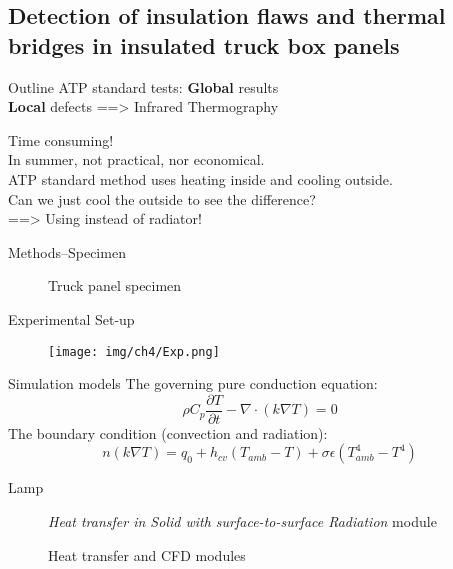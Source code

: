 \subsection{Detection of insulation flaws and thermal bridges in insulated truck box panels}

\begin{frame}{Outline}
    ATP standard tests: \textbf{Global} results\\
    \textbf{Local} defects ==> \alert{Infrared Thermography}

    Time consuming!\\
    In summer, not practical, nor economical.
    \\
    ATP standard method uses heating inside and cooling outside.\\
    Can we just cool the outside to see the difference?\\
    \pause
    ==> Using {\color{cyan}{compressed air}} instead of \alert{radiator!}
\end{frame}


\begin{frame}{Methods--Specimen}
    \begin{figure}[ht]
    \hspace*{-20pt}
    \pause
    \caption{Truck panel specimen}
    \end{figure}
 
\end{frame}


\begin{frame}{Experimental Set-up}
    \begin{figure}[ht]
        \centering
        \texttt{[image: img/ch4/Exp.png]}
    \end{figure}
\end{frame}

\begin{frame}{Simulation models}
 The governing pure conduction equation:
    \begin{equation*}
        \rho C_p \frac{\partial T}{\partial t}-\nabla \cdot (k\nabla T) = 0
    \end{equation*}
The boundary condition (convection and radiation):
    \begin{equation*}
        n(k\nabla T) = q_0 + h_{cv}(T_{amb}-T)+\sigma \epsilon(T_{amb}^4-T^4)
    \end{equation*}
\pause
    \begin{description}
        \item[Lamp {\color{red}{Heating}}] \textit{Heat transfer in Solid with surface-to-surface Radiation} module  
        \item[{\color{cyan}{Air Cooling}}] Heat transfer and CFD modules    
    \end{description}
\end{frame}

